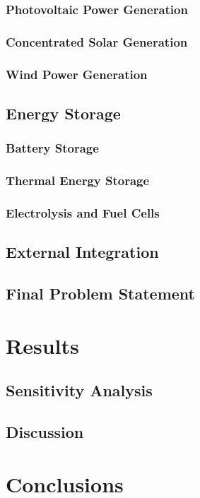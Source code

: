 \documentclass[preprint,12pt]{elsarticle}
\begin{document}
\subsubsection{Photovoltaic Power Generation}
\label{sub:pv}

\subsubsection{Concentrated Solar Generation}
\label{sub:csp}

\subsubsection{Wind Power Generation}
\label{sub:wind}

\subsection{Energy Storage}
\label{sub:storage}

\subsubsection{Battery Storage}
\label{sub:battery}

\subsubsection{Thermal Energy Storage}
\label{sub:thermal}

\subsubsection{Electrolysis and Fuel Cells}
\label{sub:electrolysis}

\subsection{External Integration}
\label{sub:integration}

\subsection{Final Problem Statement}
\label{sub:problem}

\section{Results}
\label{sec:results}

\subsection{Sensitivity Analysis}
\label{sub:sensitivity}

\subsection{Discussion}
\label{sub:discussion}

\section{Conclusions}
\label{sec:conclusions}


 

\end{document}
